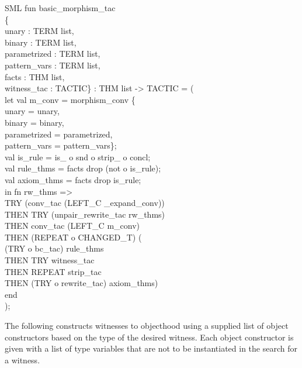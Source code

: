 \documentclass[11pt,a4paper]{article}
\begin{document}
\begin{GFT}{SML}
\+fun \PrNL{}basic\_morphism\_tac\PrNN{}\\
\+	\{\\
\+		unary : TERM list,\\
\+		binary : TERM list,\\
\+		parametrized : TERM list,\\
\+		pattern\_vars : TERM list,\\
\+		facts : THM list,\\
\+		witness\_tac : TACTIC\} : THM list -> TACTIC = (\\
\+	let	val m\_conv = morphism\_conv \{\\
\+			unary = unary,\\
\+			binary = binary,\\
\+			parametrized = parametrized,\\
\+			pattern\_vars = pattern\_vars\};\\
\+		val is\_rule = is\_\PrLE{} o snd o strip\_\PrLF{} o concl;\\
\+		val rule\_thms = facts drop (not o is\_rule);\\
\+		val axiom\_thms = facts drop is\_rule;\\
\+	in	fn rw\_thms =>\\
\+			TRY (conv\_tac (LEFT\_C \PrMI{}\_expand\_conv))\\
\+		THEN	TRY (unpair\_rewrite\_tac rw\_thms)\\
\+		THEN	conv\_tac (LEFT\_C m\_conv)	\\
\+		THEN 	(REPEAT o CHANGED\_T) (\\
\+				(TRY o bc\_tac) rule\_thms\\
\+			THEN	TRY witness\_tac\\
\+			THEN	REPEAT strip\_tac\\
\+			THEN	(TRY o rewrite\_tac) axiom\_thms)\\
\+	end\\
\+);\\
\end{GFT}
The following constructs witnesses to objecthood using a supplied list of object constructors based on the type of the desired witness.
Each object constructor is given with a list of type variables that are not to be instantiated in the search for a witness.
\end{document}
